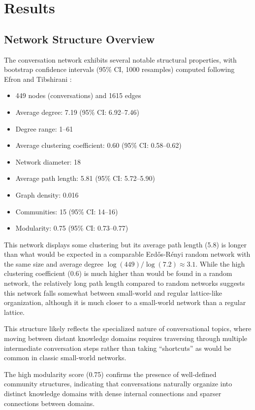 \documentclass[10pt, a4paper]{article}
\begin{document}
\section{Results}

\subsection{Network Structure Overview}

The conversation network exhibits several notable structural properties, with bootstrap confidence intervals (95\% CI, 1000 resamples) computed following Efron and Tibshirani \cite{efron1993}:

\begin{itemize}
    \item 449 nodes (conversations) and 1615 edges
    \item Average degree: 7.19 (95\% CI: 6.92--7.46)
    \item Degree range: 1--61
    \item Average clustering coefficient: 0.60 (95\% CI: 0.58--0.62)
    \item Network diameter: 18
    \item Average path length: 5.81 (95\% CI: 5.72--5.90)
    \item Graph density: 0.016
    \item Communities: 15 (95\% CI: 14--16)
    \item Modularity: 0.75 (95\% CI: 0.73--0.77)
\end{itemize}


This network displays some clustering but its average path length (5.8) is longer than what would be expected in a comparable Erdős-Rényi random network with the same size and average degree $\log(449)/\log(7.2) \approx 3.1$. While the high clustering coefficient (0.6) is much higher than would be found in a random network, the relatively long path length compared to random networks suggests this network falls somewhat between small-world and regular lattice-like organization, although it is much closer to a small-world network than a regular lattice.

This structure likely reflects the specialized nature of conversational topics, where moving between distant knowledge domains requires traversing through multiple intermediate conversation steps rather than taking ``shortcuts'' as would be common in classic small-world networks.

The high modularity score (0.75) confirms the presence of well-defined community structures, indicating that conversations naturally organize into distinct knowledge domains with dense internal connections and sparser connections between domains.
\end{document}
